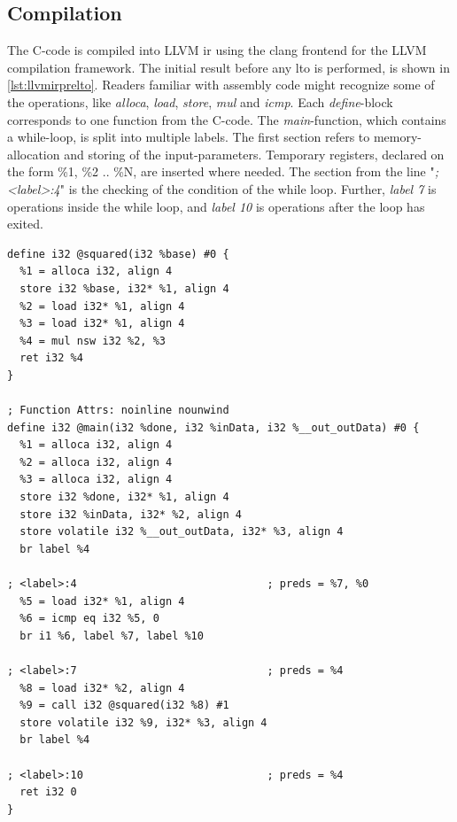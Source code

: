 \subsection{Compilation}
The C-code is compiled into LLVM \gls{ir} using the clang frontend for the LLVM compilation framework. The initial result before any \gls{lto} is performed, is shown in \cref{lst:llvmirprelto}. Readers familiar with assembly code might recognize some of the operations, like \textit{alloca}, \textit{load}, \textit{store}, \textit{mul} and \textit{icmp}. Each \textit{define}-block corresponds to one function from the C-code. The \textit{main}-function, which contains a while-loop, is split into multiple labels. The first section refers to memory-allocation and storing of the input-parameters. Temporary registers, declared on the form \%1, \%2 .. \%N, are inserted where needed. The section from the line "\textit{; <label>:4}" is the checking of the condition of the while loop. Further, \textit{label 7} is operations inside the while loop, and \textit{label 10} is operations after the loop has exited.
\lstset{language=llvm,style=LLVMstyle}
\begin{lstlisting}[caption={LLVM IR before LTO},label=lst:llvmirprelto]
define i32 @squared(i32 %base) #0 {
  %1 = alloca i32, align 4
  store i32 %base, i32* %1, align 4
  %2 = load i32* %1, align 4
  %3 = load i32* %1, align 4
  %4 = mul nsw i32 %2, %3
  ret i32 %4
}

; Function Attrs: noinline nounwind
define i32 @main(i32 %done, i32 %inData, i32 %__out_outData) #0 {
  %1 = alloca i32, align 4
  %2 = alloca i32, align 4
  %3 = alloca i32, align 4
  store i32 %done, i32* %1, align 4
  store i32 %inData, i32* %2, align 4
  store volatile i32 %__out_outData, i32* %3, align 4
  br label %4

; <label>:4                              ; preds = %7, %0
  %5 = load i32* %1, align 4
  %6 = icmp eq i32 %5, 0
  br i1 %6, label %7, label %10

; <label>:7                              ; preds = %4
  %8 = load i32* %2, align 4
  %9 = call i32 @squared(i32 %8) #1
  store volatile i32 %9, i32* %3, align 4
  br label %4

; <label>:10                             ; preds = %4
  ret i32 0
}
\end{lstlisting}
